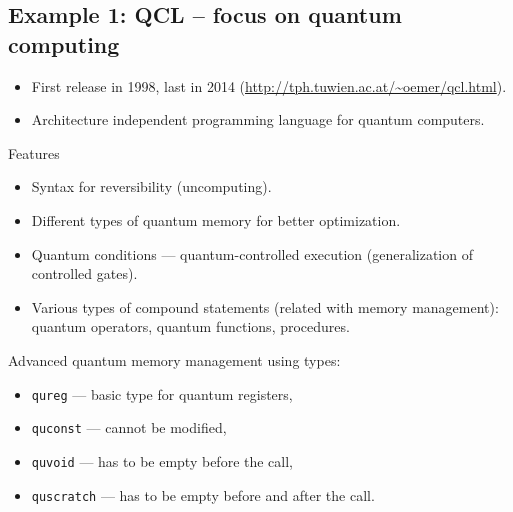 \documentclass{beamer}
\begin{document}
\subsection{Example 1: QCL -- focus on quantum computing}

\begin{frame}{\insertsection}{\insertsubsection}
	\begin{itemize}
		\item<1-> First release in 1998, last in 2014 
		(\url{http://tph.tuwien.ac.at/~oemer/qcl.html}).
		\item<2-> Architecture independent programming language for quantum 
		computers.

	\end{itemize}
	
\end{frame}

\begin{frame}{\insertsection}{\insertsubsection}
    Features
    \begin{itemize}
        \item<1-> Syntax for reversibility (uncomputing).
        \item<2-> Different types of quantum memory for better optimization.
        \item<3-> Quantum conditions --- quantum-controlled execution 
        (generalization of controlled 
        gates).
        \item<4-> Various types of compound statements (related with memory 
        management): quantum operators, quantum functions, procedures.

    \end{itemize}
\end{frame}

\begin{frame}{\insertsection}{\insertsubsection}
    Advanced quantum memory management using types:
    \begin{itemize}
        \item<1-> \texttt{qureg} ---  basic type for quantum registers,
        \item<2-> \texttt{quconst} --- cannot be modified,
        \item<3-> \texttt{quvoid} --- has to be empty before the call,
        \item<4-> \texttt{quscratch} --- has to be empty before and after the 
        call.
    \end{itemize}
\end{frame}
\end{document}
